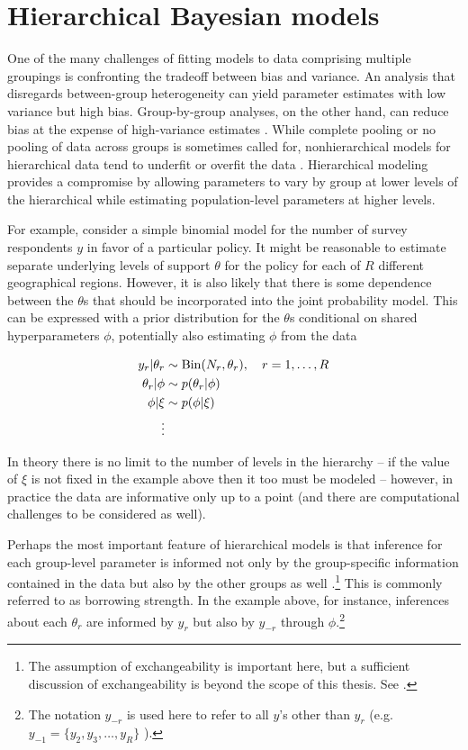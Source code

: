 \section{Hierarchical Bayesian models}
\label{hierarchical}

One of the many challenges of fitting models to data comprising multiple groupings is 
confronting the tradeoff between bias and variance. An analysis that disregards between-group 
heterogeneity can yield parameter estimates with low variance but high bias. Group-by-group 
analyses, on the other hand, can reduce bias at the expense of high-variance estimates . While complete pooling or no pooling of data across 
groups is sometimes called for, nonhierarchical models for hierarchical data tend to underfit 
or overfit the data . Hierarchical modeling provides a 
compromise by allowing parameters to vary by group at lower levels of the hierarchical while 
estimating population-level parameters at higher levels. 

For example, consider a simple binomial model for the number of survey respondents $y$ in 
favor of a particular policy. It might be reasonable to estimate separate underlying levels of 
support $\theta$ for the policy for each of $R$ different geographical regions. However, it is 
also likely that there is some dependence between the $\theta$s that should be incorporated 
into the joint probability model. This can be expressed with a prior distribution for the $\theta$s 
conditional on shared hyperparameters $\phi$, potentially also estimating $\phi$ from the data 

\begin{align*}
  y_r | \theta_r &\sim {\rm Bin}(N_r, \theta_r), \quad r = 1, \dots, R \\
  \theta_r  | \phi &\sim p(\theta_r | \phi) \\
  \phi | \xi & \sim p(\phi | \xi)  \\
  \vdots
\end{align*}

In theory there is no limit to the number of levels in the hierarchy -- if the value of $\xi$ is not 
fixed in the example above then it too must be modeled -- however, in practice the data are 
informative only up to a point (and there are computational challenges to be considered as well). 

Perhaps the most important feature of hierarchical models is that inference for each group-level 
parameter is informed not only by the group-specific information contained in the data but also 
by the other groups as well .\footnote{
The assumption of exchangeability is important here, but a sufficient discussion of exchangeability 
is beyond the scope of this thesis. See .} This is commonly referred 
to as borrowing strength. In the example above, for instance, inferences about each $\theta_r$ are 
informed by $y_r$ but also by $y_{-r}$ through $\phi$.\footnote{The notation $y_{-r}$ is used here 
to refer to all $y$'s other than $y_r$ (e.g. $y_{-1} =  \{y_2, y_3, \dots, y_R\}$ ).} 


